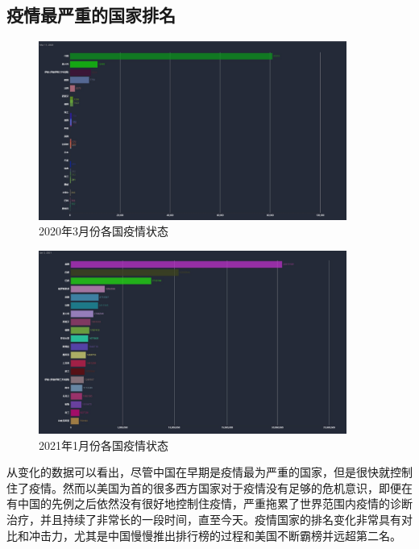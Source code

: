 \documentclass{ctexart}
\begin{document}
\subsection{疫情最严重的国家排名}
\begin{figure}[H]
    \centering
    \includegraphics[width=0.9\textwidth]{img/begin}
    \caption{2020年3月份各国疫情状态}
    \label{}
\end{figure}
\begin{figure}[H]
    \centering
    \includegraphics[width=0.9\textwidth]{img/end}
    \caption{2021年1月份各国疫情状态}
    \label{}
\end{figure}
从变化的数据可以看出，尽管中国在早期是疫情最为严重的国家，但是很快就控制住了疫情。然而以美国为首的很多西方国家对于疫情没有足够的危机意识，即便在有中国的先例之后依然没有很好地控制住疫情，严重拖累了世界范围内疫情的诊断治疗，并且持续了非常长的一段时间，直至今天。疫情国家的排名变化非常具有对比和冲击力，尤其是中国慢慢推出排行榜的过程和美国不断霸榜并远超第二名。
\end{document}
